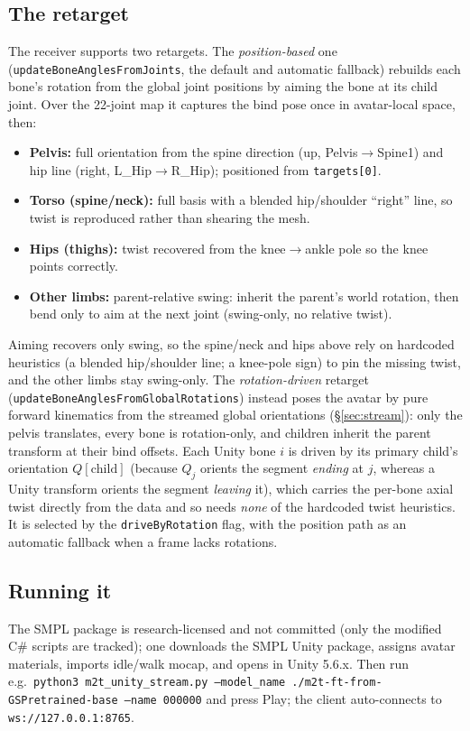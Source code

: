 \documentclass[10pt,twocolumn]{article}
\newcommand{\code}[1]{\texttt{\small #1}}
\begin{document}
\subsection{The retarget}
The receiver supports two retargets. The \emph{position-based} one
(\code{updateBoneAnglesFromJoints}, the default and automatic fallback) rebuilds each bone's
rotation from the global joint positions by aiming the bone at its child joint. Over the 22-joint
map it captures the bind pose once in avatar-local space, then:
\begin{itemize}
  \item \textbf{Pelvis:} full orientation from the spine direction (up, Pelvis$\rightarrow$Spine1)
        and hip line (right, L\_Hip$\rightarrow$R\_Hip); positioned from \code{targets[0]}.
  \item \textbf{Torso (spine/neck):} full basis with a blended hip/shoulder ``right'' line, so
        twist is reproduced rather than shearing the mesh.
  \item \textbf{Hips (thighs):} twist recovered from the knee$\rightarrow$ankle pole so the knee
        points correctly.
  \item \textbf{Other limbs:} parent-relative swing: inherit the parent's world rotation, then
        bend only to aim at the next joint (swing-only, no relative twist).
\end{itemize}
Aiming recovers only swing, so the spine/neck and hips above rely on hardcoded heuristics (a
blended hip/shoulder line; a knee-pole sign) to pin the missing twist, and the other limbs stay
swing-only. The \emph{rotation-driven} retarget (\code{updateBoneAnglesFromGlobalRotations}) instead
poses the avatar by pure forward kinematics from the streamed global orientations
(\S\ref{sec:stream}): only the pelvis translates, every bone is rotation-only, and children inherit
the parent transform at their bind offsets. Each Unity bone $i$ is driven by its primary child's
orientation $Q[\text{child}]$ (because $Q_j$ orients the segment \emph{ending} at $j$, whereas a
Unity transform orients the segment \emph{leaving} it), which carries the per-bone axial twist
directly from the data and so needs \emph{none} of the hardcoded twist heuristics. It is selected by
the \code{driveByRotation} flag, with the position path as an automatic fallback when a frame lacks
rotations.

\subsection{Running it}
The SMPL package is research-licensed and not committed (only the modified C\# scripts are tracked);
one downloads the SMPL Unity package, assigns avatar materials, imports idle/walk mocap, and opens
in Unity 5.6.x. Then run e.g.\
\code{python3 m2t\_unity\_stream.py --model\_name ./m2t-ft-from-GSPretrained-base --name 000000} and
press Play; the client auto-connects to \code{ws://127.0.0.1:8765}.
\end{document}
